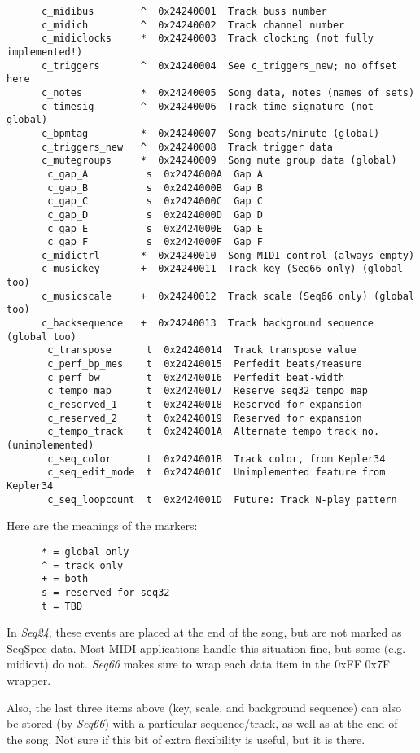    \begin{verbatim}
      c_midibus        ^  0x24240001  Track buss number
      c_midich         ^  0x24240002  Track channel number
      c_midiclocks     *  0x24240003  Track clocking (not fully implemented!)
      c_triggers       ^  0x24240004  See c_triggers_new; no offset here
      c_notes          *  0x24240005  Song data, notes (names of sets)
      c_timesig        ^  0x24240006  Track time signature (not global)
      c_bpmtag         *  0x24240007  Song beats/minute (global)
      c_triggers_new   ^  0x24240008  Track trigger data
      c_mutegroups     *  0x24240009  Song mute group data (global)
	   c_gap_A          s  0x2424000A  Gap A
	   c_gap_B          s  0x2424000B  Gap B
	   c_gap_C          s  0x2424000C  Gap C
	   c_gap_D          s  0x2424000D  Gap D
	   c_gap_E          s  0x2424000E  Gap E
	   c_gap_F          s  0x2424000F  Gap F
      c_midictrl       *  0x24240010  Song MIDI control (always empty)
      c_musickey       +  0x24240011  Track key (Seq66 only) (global too)
      c_musicscale     +  0x24240012  Track scale (Seq66 only) (global too)
      c_backsequence   +  0x24240013  Track background sequence (global too)
	   c_transpose      t  0x24240014  Track transpose value
	   c_perf_bp_mes    t  0x24240015  Perfedit beats/measure
	   c_perf_bw        t  0x24240016  Perfedit beat-width
	   c_tempo_map      t  0x24240017  Reserve seq32 tempo map
	   c_reserved_1     t  0x24240018  Reserved for expansion
	   c_reserved_2     t  0x24240019  Reserved for expansion
	   c_tempo_track    t  0x2424001A  Alternate tempo track no. (unimplemented)
	   c_seq_color      t  0x2424001B  Track color, from Kepler34
	   c_seq_edit_mode  t  0x2424001C  Unimplemented feature from Kepler34
	   c_seq_loopcount  t  0x2424001D  Future: Track N-play pattern
   \end{verbatim}

   Here are the meanings of the markers:

   \begin{verbatim}
      * = global only
      ^ = track only
      + = both
      s = reserved for seq32
      t = TBD
   \end{verbatim}

   In \textsl{Seq24}, these events are placed at the end of the song, but are
   not marked as SeqSpec data.  Most MIDI applications handle this situation
   fine, but some (e.g. midicvt) do not.  \textsl{Seq66} makes
   sure to wrap each data item in the 0xFF 0x7F wrapper.

   Also, the last three items above (key, scale, and background sequence) can
   also be stored (by \textsl{Seq66}) with a particular sequence/track,
   as well as at the end of the song.  Not sure if this bit of extra
   flexibility is useful, but it is there.

